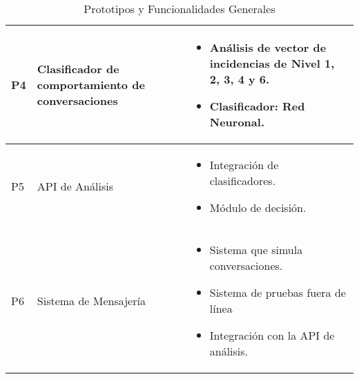 \begin{table}[h]
\begin{center}
\begin{tabular}{|l|p{45mm}|p{80mm}|}
\hline 



P4 & Clasificador de comportamiento de conversaciones & \begin{itemize}
\item An\'alisis de vector de incidencias de Nivel 1, 2, 3, 4 y 6.
\item Clasificador: Red Neuronal.
\end{itemize} \\

\hline 

P5 & API de An\'alisis & \begin{itemize}
\item Integraci\'on de clasificadores.
\item M\'odulo de decisi\'on.
\end{itemize} \\

\hline 

P6 & Sistema de Mensajer\'ia & \begin{itemize}
\item Sistema que simula conversaciones.
\item Sistema de pruebas fuera de l\'inea
\item Integraci\'on con la API de an\'alisis. 
\end{itemize} \\

\hline 


\end{tabular}
\caption{Prototipos y Funcionalidades Generales}
\label{tablaprototipos}

\end{center}

\end{table}
